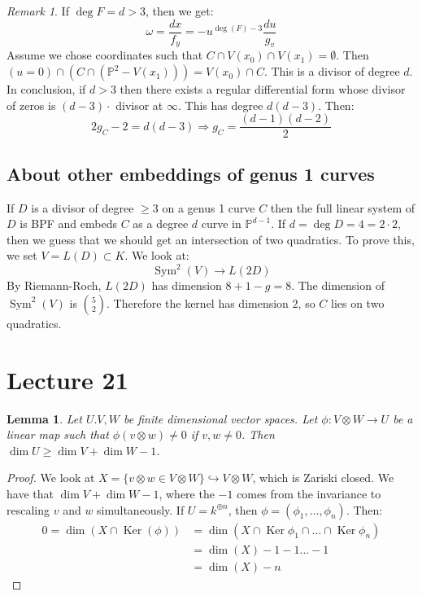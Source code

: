 \documentclass{article}
\newcommand{\Proj}{\mathbb{P}}
\DeclareMathOperator{\Ker}{Ker}
\DeclareMathOperator{\Sym}{Sym}
\theoremstyle{plain}
\newtheorem*{lem*}{Lemma}
\theoremstyle{definition}
\theoremstyle{remark}
\newtheorem*{rem}{Remark}
\begin{document}
\begin{rem}
If $\deg F = d>3$, then we get:
\[      \omega = \frac{dx}{f_y} = - u^{\deg(F) - 3} \frac{du}{g_v}    \]
Assume we chose coordinates such that $C \cap V(x_0) \cap V(x_1) = \emptyset$. Then $(u=0) \cap (C\cap (\Proj^2 - V(x_1))) = V(x_0) \cap C$. This is a divisor of degree $d$.  In conclusion, if $d>3$ then there exists a regular differential form whose divisor of zeros is $(d-3) \cdot$ divisor at $\infty$. This has degree $d(d-3)$. Then:
\[      2g_C - 2 = d(d-3) \Rightarrow g_C = \frac{(d-1)(d-2)}{2}    \]
\end{rem}

\subsection*{About other embeddings of genus 1 curves}
If $D$ is a divisor of degree $\geq 3$ on a genus 1 curve $C$ then the full linear system of $D$ is BPF and embeds $C$ as a degree $d$ curve in $\Proj^{d-1}$. If $d = \deg D = 4 = 2\cdot 2$, then we guess that we should get an intersection of two quadratics. To prove this, we set $V = L(D) \subset K$. We look at:
\[        \Sym^2(V) \to L(2D)     \]
By Riemann-Roch, $L(2D)$ has dimension $8+1 - g = 8$. The dimension of $\Sym^2(V)$ is $\binom{5}{2}$. Therefore the kernel has dimension $2$, so $C$ lies on two quadratics.


\section*{Lecture 21}
\begin{lem*}
Let $U.V,W$ be finite dimensional vector spaces. Let $\phi: V\otimes W \to U$ be a linear map such that $\phi(v\otimes w) \neq 0$ if $v,w\neq 0$. Then $\dim U \geq \dim V + \dim W - 1$.
\end{lem*}
\begin{proof}
We look at $X = \{ v \otimes w \in V\otimes W \} \hookrightarrow V \otimes W$, which is Zariski closed. We have that $\dim V + \dim W - 1$, where the $-1$ comes from the invariance to rescaling $v$ and $w$ simultaneously. If $U = k^{\oplus n}$, then $\phi = (\phi_1, \dots, \phi_n)$. Then:
\begin{align*}        
0 = \dim(X \cap \Ker(\phi)) &= \dim( X\cap \Ker \phi_1 \cap \dots \cap \Ker \phi_n)  \\
&= \dim(X) - 1 - 1 \dots -1 \\
&= \dim(X) - n
\end{align*}
\end{proof}
\end{document}
